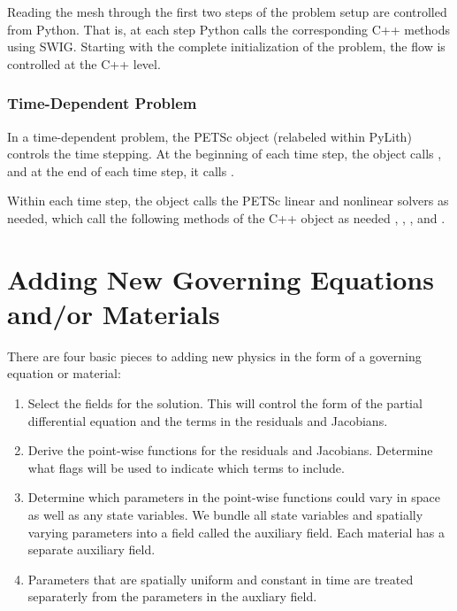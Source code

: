 Reading the mesh through the first two steps of the problem setup are
controlled from Python. That is, at each step Python calls the
corresponding C++ methods using SWIG. Starting with the complete
initialization of the problem, the flow is controlled at the C++
level.

\subsubsection{Time-Dependent Problem}

In a time-dependent problem, the PETSc  object (relabeled
 within PyLith) controls the time stepping. At the
beginning of each time step, the  object calls
, and at the end of each
time step, it calls .

Within each time step, the  object calls the PETSc
linear and nonlinear solvers as needed, which call the following
methods of the C++  object as
needed
,
,
, and
.

\section{Adding New Governing Equations and/or Materials}

There are four basic pieces to adding new physics in the form of a
governing equation or material:
\begin{enumerate}
\item Select the fields for the solution. This will control the form
  of the partial differential equation and the terms in the residuals
  and Jacobians.
\item Derive the point-wise functions for the residuals and
  Jacobians. Determine what flags will be used to indicate which terms
  to include.
\item Determine which parameters in the point-wise functions could
  vary in space as well as any state variables. We bundle all state variables
  and spatially varying parameters into a field called the auxiliary
  field. Each material has a separate auxiliary field.
\item Parameters that are spatially uniform and constant in time
  are treated separaterly from the parameters in the auxliary field.
\end{enumerate}

